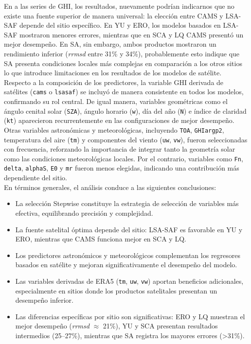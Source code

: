 En a las series de GHI, los resultados, nuevamente podrían indicarnos que no existe una fuente superior de manera universal: la elección entre CAMS y LSA-SAF depende del sitio específico. En YU y ERO, los modelos basados en LSA-SAF mostraron menores errores, mientras que en SCA y LQ CAMS presentó un mejor desempeño. En SA, sin embargo, ambos productos mostraron un rendimiento inferior (\textit{rrmsd} entre 31\% y 34\%), probablemente esto indique que SA presenta condiciones locales más complejas en comparación a los otros sitios lo que introduce limitaciones en los resultados de los modelos de satélite.\\

Respecto a la composición de los predictores, la variable GHI derivada de satélites (\texttt{cams} o \texttt{lsasaf}) se incluyó de manera consistente en todos los modelos, confirmando su rol central. De igual manera, variables geométricas como el ángulo cenital solar (\texttt{SZA}), ángulo horario (\texttt{w}), día del año (\texttt{N}) e índice de claridad (\texttt{kt}) aparecieron recurrentemente en las configuraciones de mejor desempeño. Otras variables astronómicas y meteorológicas, incluyendo \texttt{TOA}, \texttt{GHIargp2}, temperatura del aire (\texttt{tm}) y componentes del viento (\texttt{uw}, \texttt{vw}), fueron seleccionadas con frecuencia, reforzando la importancia de integrar tanto la geometría solar como las condiciones meteorológicas locales. Por el contrario, variables como \texttt{Fn}, \texttt{delta}, \texttt{alphaS}, \texttt{E0} y \texttt{mr} fueron menos elegidas, indicando una contribución más dependiente del sitio.\\

En términos generales, el análisis conduce a las siguientes conclusiones:
\begin{itemize}
\item La selección Stepwise constituye la estrategia de selección de variables más efectiva, equilibrando precisión y complejidad.
\item La fuente satelital óptima depende del sitio: LSA-SAF es favorable en YU y ERO, mientras que CAMS funciona mejor en SCA y LQ.
\item Los predictores astronómicos y meteorológicos complementan los regresores basados en satélite y mejoran significativamente el desempeño del modelo.
\item Las variables derivadas de ERA5 (\texttt{tm}, \texttt{uw}, \texttt{vw}) aportan beneficios adicionales, especialmente en sitios donde los productos satelitales presentan un desempeño inferior.
\item Las diferencias específicas por sitio son significativas: ERO y LQ muestran el mejor desempeño (\textit{rrmsd} $\approx$ 21\%), YU y SCA presentan resultados intermedios (25–27\%), mientras que SA registra los mayores errores (>31\%).
\end{itemize}


